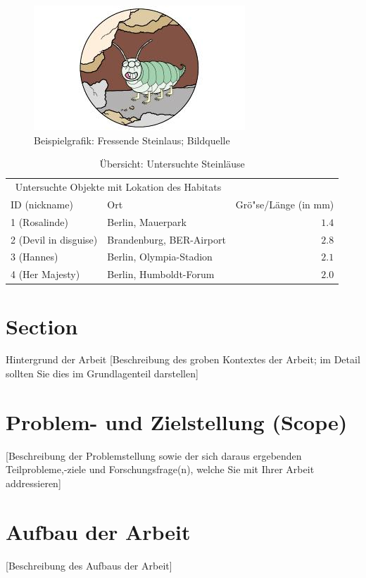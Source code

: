 \documentclass[oneside,bibliography=totocnumbered,BCOR=5mm]{scrbook}%
\theoremstyle{definition}
\theoremstyle{definition}
\theoremstyle{definition}
\theoremstyle{definition}
\theoremstyle{definition}
\theoremstyle{definition}
\begin{document}
\begin{figure}
\centering
\includegraphics{steinlaus2.jpg}
  \caption{Beispielgrafik: Fressende Steinlaus; Bildquelle \autocite{loriot2}}
\end{figure}

\begin{table}
\caption{\"Ubersicht: Untersuchte Steinl\"ause}
\centering
\begin{tabular}{llr}
\toprule
\multicolumn{2}{c}{Untersuchte Objekte mit Lokation des Habitats} \\
\cmidrule(r){1-2}
ID (nickname) & Ort & Gr\"o"se/L\"ange (in mm) \\
\midrule
1 (Rosalinde) & Berlin, Mauerpark & $1.4$ \\
2 (Devil in disguise) & Brandenburg, BER-Airport & $2.8$ \\
3 (Hannes) & Berlin, Olympia-Stadion & $2.1$ \\
4 (Her Majesty) & Berlin, Humboldt-Forum & $2.0$ \\
\bottomrule
\end{tabular}
\end{table}

\section{Section}
Hintergrund der Arbeit
[Beschreibung des groben Kontextes der Arbeit; im Detail sollten Sie dies im Grundlagenteil darstellen] 


\section{Problem- und Zielstellung (Scope)}
[Beschreibung der Problemstellung sowie der sich daraus ergebenden Teilprobleme,-ziele und Forschungsfrage(n), welche Sie mit Ihrer Arbeit addressieren]


\section{Aufbau der Arbeit}
[Beschreibung des Aufbaus der Arbeit]
\end{document}
